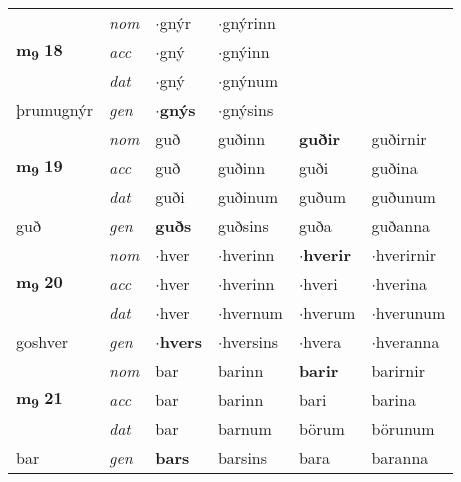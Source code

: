 \begin{longtable}[l]{llllll}
\multirow{3}{*}{{{\textbf{m{\textsubscript{9}}} \Large{\textbf{18}}}}}  & {\footnotesize{{\textit{nom}}}} & $\cdot$gnýr & $\cdot$gnýrinn    & \textbf{} &   \\*
 &  {\footnotesize{{\textit{acc}}}} & $\cdot$gný  & $\cdot$gnýinn   &   &  \\*
 &  {\footnotesize{{\textit{dat}}}} & $\cdot$gný & $\cdot$gnýnum   &  &  \\*
 {\footnotesize{þrumugnýr}} &   {\footnotesize{{\textit{gen}}}} & \textbf{$\cdot$gnýs}  & $\cdot$gnýsins  &  &  \\
\cmidrule{1-6}


\multirow{3}{*}{{{\textbf{m{\textsubscript{9}}} \Large{\textbf{19}}}}}  & {\footnotesize{{\textit{nom}}}} & guð & guðinn    & \textbf{guðir} & guðirnir  \\*
 &  {\footnotesize{{\textit{acc}}}} & guð  & guðinn   & guði  & guðina \\*
 &  {\footnotesize{{\textit{dat}}}} & guði & guðinum   & guðum & guðunum \\*
 {\footnotesize{guð}} &   {\footnotesize{{\textit{gen}}}} & \textbf{guðs}  & guðsins  & guða & guðanna \\
\cmidrule{1-6}


\multirow{3}{*}{{{\textbf{m{\textsubscript{9}}} \Large{\textbf{20}}}}}  & {\footnotesize{{\textit{nom}}}} & $\cdot$hver & $\cdot$hverinn    & \textbf{$\cdot$hverir} & $\cdot$hverirnir  \\*
 &  {\footnotesize{{\textit{acc}}}} & $\cdot$hver  & $\cdot$hverinn   & $\cdot$hveri  & $\cdot$hverina \\*
 &  {\footnotesize{{\textit{dat}}}} & $\cdot$hver & $\cdot$hvernum   & $\cdot$hverum & $\cdot$hverunum \\*
 {\footnotesize{goshver}} &   {\footnotesize{{\textit{gen}}}} & \textbf{$\cdot$hvers}  & $\cdot$hversins  & $\cdot$hvera & $\cdot$hveranna \\
\cmidrule{1-6}


\multirow{3}{*}{{{\textbf{m{\textsubscript{9}}} \Large{\textbf{21}}}}}  & {\footnotesize{{\textit{nom}}}} & bar & barinn    & \textbf{barir} & barirnir  \\*
 &  {\footnotesize{{\textit{acc}}}} & bar  & barinn   & bari  & barina \\*
 &  {\footnotesize{{\textit{dat}}}} & bar & barnum   & börum & börunum \\*
 {\footnotesize{bar}} &   {\footnotesize{{\textit{gen}}}} & \textbf{bars}  & barsins  & bara & baranna \\
\cmidrule{1-6}



\end{longtable}

